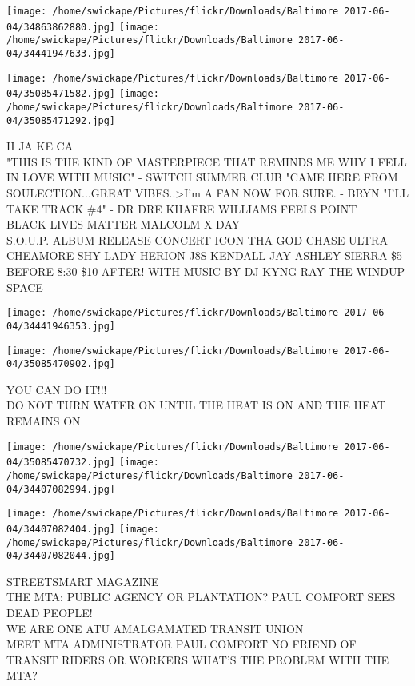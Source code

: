 \documentclass[10pt,letterpaper]{article}
\begin{document}
\texttt{[image: /home/swickape/Pictures/flickr/Downloads/Baltimore 2017-06-04/34863862880.jpg]}
\texttt{[image: /home/swickape/Pictures/flickr/Downloads/Baltimore 2017-06-04/34441947633.jpg]}

\texttt{[image: /home/swickape/Pictures/flickr/Downloads/Baltimore 2017-06-04/35085471582.jpg]}
\texttt{[image: /home/swickape/Pictures/flickr/Downloads/Baltimore 2017-06-04/35085471292.jpg]}

H JA KE CA\\
"THIS IS THE KIND OF MASTERPIECE THAT REMINDS ME WHY I FELL IN LOVE WITH MUSIC" {-} SWITCH SUMMER CLUB "CAME HERE FROM SOULECTION...GREAT VIBES..>I'm A FAN NOW FOR SURE.  {-} BRYN "I'LL TAKE TRACK \#4" {-} DR DRE KHAFRE WILLIAMS FEELS POINT\\
BLACK LIVES MATTER MALCOLM X DAY\\
S.O.U.P. ALBUM RELEASE CONCERT ICON THA GOD CHASE ULTRA CHEAMORE SHY LADY HERION J8S KENDALL JAY ASHLEY SIERRA \$5 BEFORE 8:30 \$10 AFTER!  WITH MUSIC BY DJ KYNG RAY THE WINDUP SPACE\\
\pagebreak

\texttt{[image: /home/swickape/Pictures/flickr/Downloads/Baltimore 2017-06-04/34441946353.jpg]}

\vspace{0.25in}
\texttt{[image: /home/swickape/Pictures/flickr/Downloads/Baltimore 2017-06-04/35085470902.jpg]}

YOU CAN DO IT!!!\\
DO NOT TURN WATER ON UNTIL THE HEAT IS ON AND THE HEAT REMAINS ON\\
\pagebreak

\texttt{[image: /home/swickape/Pictures/flickr/Downloads/Baltimore 2017-06-04/35085470732.jpg]}
\texttt{[image: /home/swickape/Pictures/flickr/Downloads/Baltimore 2017-06-04/34407082994.jpg]}

\texttt{[image: /home/swickape/Pictures/flickr/Downloads/Baltimore 2017-06-04/34407082404.jpg]}
\texttt{[image: /home/swickape/Pictures/flickr/Downloads/Baltimore 2017-06-04/34407082044.jpg]}

STREETSMART MAGAZINE\\
THE MTA: PUBLIC AGENCY OR PLANTATION?  PAUL COMFORT SEES DEAD PEOPLE!\\
WE ARE ONE ATU AMALGAMATED TRANSIT UNION\\
MEET MTA ADMINISTRATOR PAUL COMFORT NO FRIEND OF TRANSIT RIDERS OR WORKERS WHAT'S THE PROBLEM WITH THE MTA?\\
\pagebreak
\end{document}
